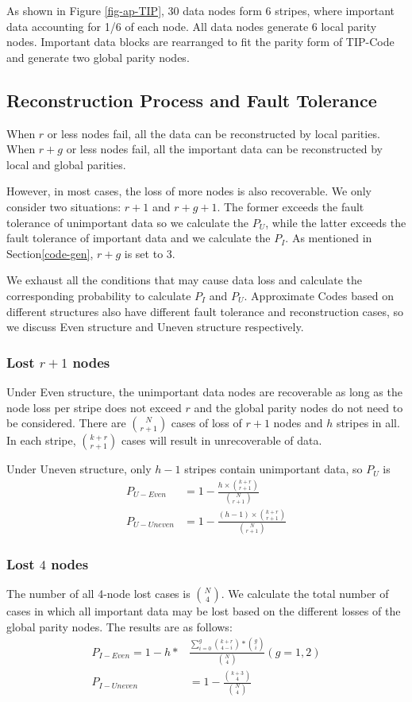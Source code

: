 \documentclass[sigconf]{acmart}
\begin{document}
As shown in Figure \ref{fig-ap-TIP}, 30 data nodes form 6 stripes, where important data accounting for 1/6 of each node.
All data nodes generate 6 local parity nodes.
Important data blocks are rearranged to fit the parity form of TIP-Code and generate two global parity nodes.

\subsection{Reconstruction Process and Fault Tolerance}\label{ReconstructionFT}
When $r$ or less nodes fail, all the data can be reconstructed by local parities.
When $r+g$ or less nodes fail, all the important data can be reconstructed by local and global parities.

However, in most cases, the loss of more nodes is also recoverable. We only consider two situations: $r+1$ and $r+g+1$.
The former exceeds the fault tolerance of unimportant data so we calculate the $P_{U}$, while the latter exceeds the fault tolerance of important data and we calculate the $P_{I}$.
As mentioned in Section\ref{code-gen}, $r+g$ is set to 3.

We exhaust all the conditions that may cause data loss and calculate the corresponding probability to calculate $P_{I}$ and $P_{U}$.
Approximate Codes based on different structures also have different fault tolerance and reconstruction cases, so we discuss Even structure and Uneven structure respectively.

\subsubsection{Lost $r+1$ nodes}
Under Even structure, the unimportant data nodes are recoverable as long as the node loss per stripe does not exceed $r$ and the global parity nodes do not need to be considered.
There are $\binom{N}{r+1}$ cases of loss of $r+1$ nodes and $h$ stripes in all. In each stripe, $\binom{k+r}{r+1}$ cases will result in unrecoverable of data.

Under Uneven structure, only $h-1$ stripes contain unimportant data, so $P_{U}$ is
\begin{align}
    P_{U-Even} &= 1 - \frac{h \times \binom{k+r}{r+1}}{\binom{N}{r+1}}\\
    P_{U-Uneven} &= 1 - \frac{(h-1) \times \binom{k+r}{r+1}}{\binom{N}{r+1}}
\end{align}

\subsubsection{Lost $4$ nodes}
The number of all 4-node lost cases is $\binom{N}{4}$.
We calculate the total number of cases in which all important data may be lost based on the different losses of the global parity nodes. The results are as follows:
\begin{align}
    P_{I-Even} = 1 - h*&\frac{\sum_{i=0}^{g} {\binom{k+r}{4-i}*\binom{g}{i}} }{\binom{N}{4}}  (g=1,2)\\
    P_{I-Uneven} &= 1 - \frac{\binom{k+3}{4}}{\binom{N}{4}}
\end{align}
\end{document}
